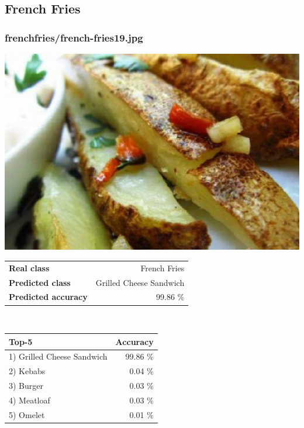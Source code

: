 \subsection{French Fries}
    
\subsubsection{french\textunderscore fries/french-fries19.jpg}

\begin{minipage}[t]{0.4\textwidth}
	\vspace{0pt}
	\includegraphics[width=\linewidth]{images/evaluation-images/french_fries/french-fries19.jpg}
\end{minipage}
\hfill
\begin{minipage}[t]{0.5\textwidth}
	\vspace{0pt}\raggedright
	\begin{tabularx}{\textwidth}{X r}
		\small \textbf{Real class} & \small French Fries\\
		\small \textbf{Predicted class} & \small Grilled Cheese Sandwich\\
		\small \textbf{Predicted accuracy} & \small 99.86 \%
    \end{tabularx}\\
    
    \vspace{6pt}
	\begin{tabularx}{\textwidth}{X r}
        \small \textbf{Top-5} & \small \textbf{Accuracy} \\
        \hline
		\small 1) Grilled Cheese Sandwich & \small 99.86 \%\\\small 2) Kebabs & \small 0.04 \%\\\small 3) Burger & \small 0.03 \%\\\small 4) Meatloaf & \small 0.03 \%\\\small 5) Omelet & \small 0.01 \%
    \end{tabularx}
\end{minipage}
    
